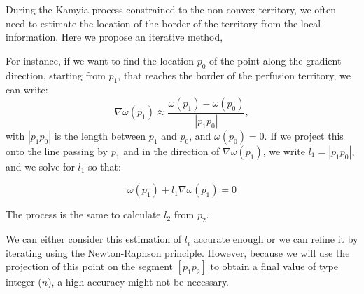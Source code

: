 \documentclass[11pt,a4paper]{article}
\begin{document}
During the Kamyia process constrained to the non-convex territory, we often need to estimate the location of the border of the territory from the local information. Here we propose an iterative method, 

For instance, if we want to find  the location $p_0$ of the point along the gradient direction, starting from $p_1$, that reaches the border of the perfusion territory, we can write:
\begin{equation}
\nabla \omega(p_1) \approx \frac{\omega(p_1) - \omega(p_0)}{|p_1p_0|},
\end{equation}
with $|p_1p_0|$ is the length between $p_1$ and $p_0$, and $\omega(p_0) = 0$. If we project this onto the line passing by $p_1$ and in the direction of $\nabla\omega(p_1)$, we write $l_1=|p_1p_0|$, and we solve for $l_1$ so that:





\begin{equation}
\omega (p_1) + l_1 \nabla\omega(p_1) = 0
\end{equation}


The process is the same to calculate $l_2$ from $p_2$.

We can either consider this estimation of $l_i$ accurate enough or we can refine it by iterating using the Newton-Raphson principle. However, because we will use the projection of this point on the segment $[p_1p_2]$ to obtain a final value of type integer ($n$), a high accuracy might not be necessary.
\end{document}
